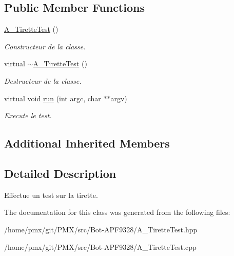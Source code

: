 \subsection*{Public Member Functions}
\begin{DoxyCompactItemize}
\item 
\mbox{\label{classA__TiretteTest_ab4d0ca6a166b837347f78ad48ec4cd2d}} 
\hyperlink{classA__TiretteTest_ab4d0ca6a166b837347f78ad48ec4cd2d}{A\+\_\+\+Tirette\+Test} ()
\begin{DoxyCompactList}\small\item\em Constructeur de la classe. \end{DoxyCompactList}\item 
\mbox{\label{classA__TiretteTest_a0c2296d8da35117b7fc99f4de431f0e8}} 
virtual \hyperlink{classA__TiretteTest_a0c2296d8da35117b7fc99f4de431f0e8}{$\sim$\+A\+\_\+\+Tirette\+Test} ()
\begin{DoxyCompactList}\small\item\em Destructeur de la classe. \end{DoxyCompactList}\item 
\mbox{\label{classA__TiretteTest_ad33ea95cc22c7b0e438faae54df6ef9b}} 
virtual void \hyperlink{classA__TiretteTest_ad33ea95cc22c7b0e438faae54df6ef9b}{run} (int argc, char $\ast$$\ast$argv)
\begin{DoxyCompactList}\small\item\em Execute le test. \end{DoxyCompactList}\end{DoxyCompactItemize}
\subsection*{Additional Inherited Members}


\subsection{Detailed Description}
Effectue un test sur la tirette. 

The documentation for this class was generated from the following files\+:\begin{DoxyCompactItemize}
\item 
/home/pmx/git/\+P\+M\+X/src/\+Bot-\/\+A\+P\+F9328/A\+\_\+\+Tirette\+Test.\+hpp\item 
/home/pmx/git/\+P\+M\+X/src/\+Bot-\/\+A\+P\+F9328/A\+\_\+\+Tirette\+Test.\+cpp\end{DoxyCompactItemize}

